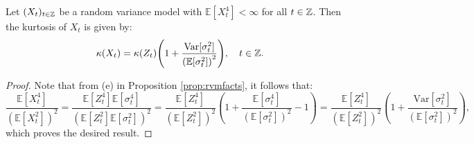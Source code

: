 \begin{prop}\label{prop:rvmkurt}
Let $(X_{t})_{t\in\mathbb{Z}}$ be a random variance model with $\mathbb{E}[X_{t}^{4}]<\infty$ for all $t\in\mathbb{Z}$. Then the kurtosis of $X_{t}$ is given by:
\begin{equation}\label{eq:rvmkurtosis}
    \kappa(X_{t})=\kappa(Z_{t})\left(1+\frac{\mathrm{Var}[\sigma_{t}^{2}]}{\left(\mathbb{E}[\sigma_{t}^{2}]\right)^{2}}\right),\quad t\in\Z.
\end{equation}
\end{prop}
\begin{proof}
Note that from (e) in Proposition \ref{prop:rvmfacts}, it follows that:
\begin{equation*}
    \frac{\mathbb{E}[X_{t}^{4}]}{\left(\mathbb{E}[X_{t}^{2}]\right)^{2}}=\frac{\mathbb{E}[Z_{t}^{4}]\mathbb{E}[\sigma_{t}^{4}]}{\left(\mathbb{E}[Z_{t}^{2}]\mathbb{E}[\sigma_{t}^{2}]\right)^{2}}=\frac{\mathbb{E}[Z_{t}^{4}]}{\left(\mathbb{E}[Z_{t}^{2}]\right)^{2}}\left(1+\frac{\mathbb{E}[\sigma_{t}^{4}]}{\left(\mathbb{E}[\sigma_{t}^{2}]\right)^{2}}-1\right)=\frac{\mathbb{E}[Z_{t}^{4}]}{\left(\mathbb{E}[Z_{t}^{2}]\right)^{2}}\left(1+\frac{\mathrm{Var}[\sigma_{t}^{2}]}{\left(\mathbb{E}[\sigma_{t}^{2}]\right)^{2}}\right),
\end{equation*}
which proves the desired result.
\end{proof}